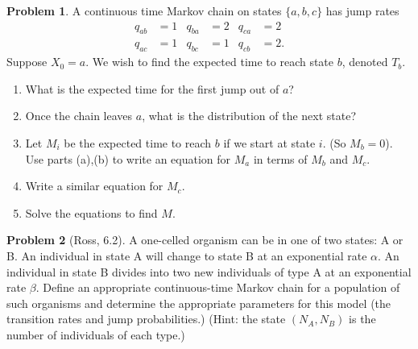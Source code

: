 \documentclass{article}
\theoremstyle{definition}
\newtheorem{problem}{Problem}
\begin{document}

\begin{problem}
  A continuous time Markov chain on states $\{a,b,c\}$ has jump rates
  \begin{align*}
    q_{ab} &= 1 &    q_{ba} &= 2 &    q_{ca} &= 2 \\
    q_{ac} &= 1 &    q_{bc} &= 1 &    q_{cb} &= 2.
  \end{align*}
  Suppose $X_0=a$. We wish to find the expected time to reach state $b$, denoted $T_b$.
  \begin{enumerate}
  \item What is the expected time for the first jump out of $a$?
  \item Once the chain leaves $a$, what is the distribution of the next state?
  \item Let $M_i$ be the expected time to reach $b$ if we start at state $i$. (So $M_b=0$). Use parts (a),(b) to write an equation for $M_a$ in terms of $M_b$ and $M_c$.
  \item Write a similar equation for $M_c$.
  \item Solve the equations to find $M$.
  \end{enumerate}
\end{problem}


\begin{problem}[Ross, 6.2]
  A one-celled organism can be in one of two states: A or B.
  An individual in state A will change to state B at an exponential rate $\alpha$.
  An individual in state B divides into two new individuals of type A at an exponential rate $\beta$.
  Define an appropriate continuous-time Markov chain for a population of such organisms and determine the appropriate parameters for this model (the transition rates and jump probabilities.)
  (Hint: the state $(N_A,N_B)$ is the number of individuals of each type.)
\end{problem}

\end{document}
